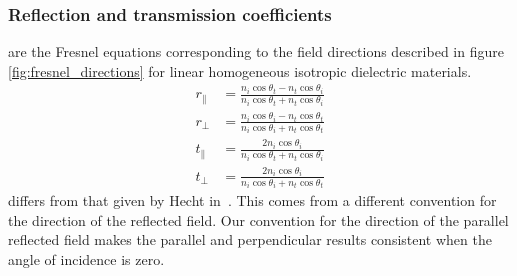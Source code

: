\subsubsection{Reflection and transmission coefficients}
 are the Fresnel equations corresponding to the field directions described in figure \cref{fig:fresnel_directions} for linear homogeneous isotropic dielectric materials.
\begin{subequations}
    \begin{align}
        r_\parallel & =
        \frac{n_i \cos \theta_t - n_t \cos \theta_i}{n_i \cos \theta_t + n_t \cos \theta_i}
        \label{eq:fresnel_rp}
        \\
        r_\perp & =
        \frac{n_i \cos \theta_i - n_t \cos \theta_t}{n_i \cos \theta_i + n_t \cos \theta_t}
        \label{eq:fresnel_rs}
        \\
        t_\parallel & =
        \frac {2 n_i \cos \theta_i}{n_i \cos \theta_t + n_t \cos \theta_i}
        \label{eq:fresnel_tp}
        \\
        t_\perp & =
        \frac {2 n_i \cos \theta_i}{n_i \cos \theta_i + n_t \cos \theta_t}
        \label{eq:fresnel_ts}
    \end{align}
    \label{eq:fresnel_oblique}
\end{subequations}
 differs from that given by Hecht in~\cite{hecht2002optics}.
This comes from a different convention for the direction of the reflected field.
Our convention for the direction of the parallel reflected field makes the parallel and perpendicular results consistent when the angle of incidence is zero.

%

